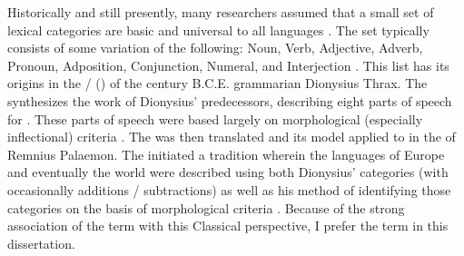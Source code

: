 Historically and still presently, many researchers assumed that a small set of lexical categories are basic and universal to all languages \parencites[81]{BolingerSears1981}[2]{Croft1991}[32]{Payne1997}[95]{Stassen2011}. The set typically consists of some variation of the following: Noun, Verb, Adjective, Adverb, Pronoun, Adposition, Conjunction, Numeral, and Interjection \parencite[16538]{Haspelmath2001}. This list has its origins in the  /  () of the  century B.C.E. grammarian Dionysius Thrax. The  synthesizes the work of Dionysius' predecessors, describing eight parts of speech for . These parts of speech were based largely on morphological (especially inflectional) criteria \parencite[17--20]{Rauh2010}. The  was then translated and its model applied to  in the  of Remnius Palaemon. The  initiated a tradition wherein the languages of Europe and eventually the world  were described using both Dionysius' categories (with occasionally additions / subtractions) as well as his method of identifying those categories on the basis of morphological criteria \parencite[20]{Rauh2010}. Because of the strong association of the term  with this Classical perspective, I prefer the term  in this dissertation.

